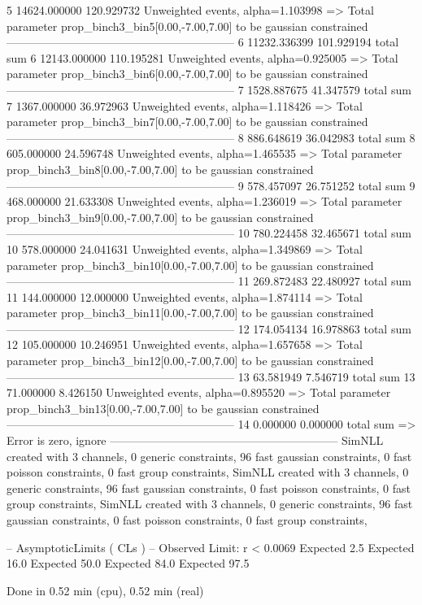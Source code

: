 5          14624.000000    120.929732      Unweighted events, alpha=1.103998
  => Total parameter prop_binch3_bin5[0.00,-7.00,7.00] to be gaussian constrained
------------------------------------------------------------
6          11232.336399    101.929194      total sum                     
6          12143.000000    110.195281      Unweighted events, alpha=0.925005
  => Total parameter prop_binch3_bin6[0.00,-7.00,7.00] to be gaussian constrained
------------------------------------------------------------
7          1528.887675     41.347579       total sum                     
7          1367.000000     36.972963       Unweighted events, alpha=1.118426
  => Total parameter prop_binch3_bin7[0.00,-7.00,7.00] to be gaussian constrained
------------------------------------------------------------
8          886.648619      36.042983       total sum                     
8          605.000000      24.596748       Unweighted events, alpha=1.465535
  => Total parameter prop_binch3_bin8[0.00,-7.00,7.00] to be gaussian constrained
------------------------------------------------------------
9          578.457097      26.751252       total sum                     
9          468.000000      21.633308       Unweighted events, alpha=1.236019
  => Total parameter prop_binch3_bin9[0.00,-7.00,7.00] to be gaussian constrained
------------------------------------------------------------
10         780.224458      32.465671       total sum                     
10         578.000000      24.041631       Unweighted events, alpha=1.349869
  => Total parameter prop_binch3_bin10[0.00,-7.00,7.00] to be gaussian constrained
------------------------------------------------------------
11         269.872483      22.480927       total sum                     
11         144.000000      12.000000       Unweighted events, alpha=1.874114
  => Total parameter prop_binch3_bin11[0.00,-7.00,7.00] to be gaussian constrained
------------------------------------------------------------
12         174.054134      16.978863       total sum                     
12         105.000000      10.246951       Unweighted events, alpha=1.657658
  => Total parameter prop_binch3_bin12[0.00,-7.00,7.00] to be gaussian constrained
------------------------------------------------------------
13         63.581949       7.546719        total sum                     
13         71.000000       8.426150        Unweighted events, alpha=0.895520
  => Total parameter prop_binch3_bin13[0.00,-7.00,7.00] to be gaussian constrained
------------------------------------------------------------
14         0.000000        0.000000        total sum                     
  => Error is zero, ignore      
------------------------------------------------------------
SimNLL created with 3 channels, 0 generic constraints, 96 fast gaussian constraints, 0 fast poisson constraints, 0 fast group constraints, 
SimNLL created with 3 channels, 0 generic constraints, 96 fast gaussian constraints, 0 fast poisson constraints, 0 fast group constraints, 
SimNLL created with 3 channels, 0 generic constraints, 96 fast gaussian constraints, 0 fast poisson constraints, 0 fast group constraints, 

 -- AsymptoticLimits ( CLs ) --
Observed Limit: r < 0.0069
Expected  2.5%
Expected 16.0%
Expected 50.0%
Expected 84.0%
Expected 97.5%

Done in 0.52 min (cpu), 0.52 min (real)

